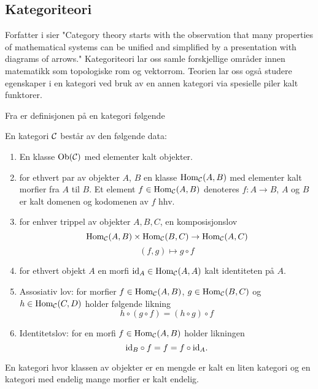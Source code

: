 \subsection{Kategoriteori}\label{Ssek:Kategoriteori}

Forfatter i \citep[introduksjon]{Lane2010} sier "Category
theory starts with the observation that many properties of
mathematical systems can be unified and simplified by
a presentation with diagrams of arrows." Kategoriteori lar
oss samle forskjellige områder innen matematikk som
topologiske rom og vektorrom. Teorien lar oss også studere
egenskaper i en kategori ved bruk av en annen kategori via
spesielle piler kalt funktorer.

Fra \citep[definisjon 1.2.1]{Agore2023} er definisjonen på en kategori
følgende

\begin{definisjon}\label{def:Kategori}
  En kategori $\mathcal{C}$ består av den følgende data:
  \begin{enumerate}
    \item En klasse $\textnormal{Ob}(\mathcal{C})$ med elementer kalt
      objekter.
    \item for ethvert par av objekter $A$, $B$ en klasse
      $\textnormal{Hom}_{\mathcal{C}}(A,B)$ med elementer kalt
      morfier fra $A$ til $B$. Et element
      $f\in\textnormal{Hom}_{\mathcal{C}}(A,B)$ denoteres $f: A\to B$, $A$ og
      $B$ er kalt domenen og kodomenen av $f$ hhv.
    \item for enhver trippel av objekter $A,B,C$, en
      komposisjonslov
      \[\textnormal{Hom}_{\mathcal{C}}(A,B)\times\textnormal{Hom}_{\mathcal{C}}(B,C)\to\textnormal{Hom}_{\mathcal{C}}(A,C)\]
      \[(f,g)\mapsto g\circ f\]
    \item for ethvert objekt $A$ en morfi
      $\textnormal{id}_A\in\textnormal{Hom}_{\mathcal{C}}(A,A)$ kalt identiteten på $A$.
    \item Assosiativ lov: for morfier
      $f\in\textnormal{Hom}_{\mathcal{C}}(A,B)$, $g\in\textnormal{Hom}_{\mathcal{C}}(B,C)$ og
      $h\in\textnormal{Hom}_{\mathcal{C}}(C,D)$ holder følgende likning
      \[h\circ(g\circ f) = (h\circ g)\circ f\]
    \item Identitetslov: for en morfi
      $f\in\textnormal{Hom}_{\mathcal{C}}(A,B)$ holder likningen
      \[\textnormal{id}_B\circ f = f = f\circ \textnormal{id}_A.\]
  \end{enumerate}
  En kategori hvor klassen av objekter er en mengde er
  kalt en liten kategori og en kategori med endelig mange
  morfier er kalt endelig.
\end{definisjon}

